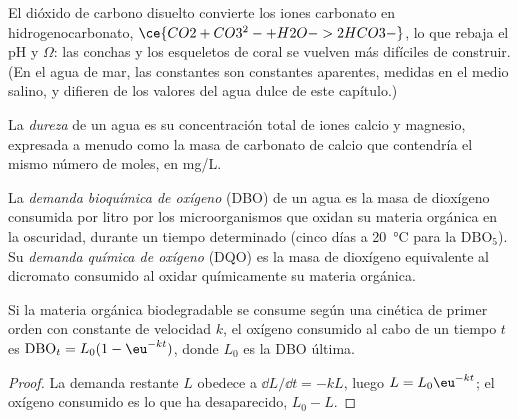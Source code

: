 El dióxido de carbono disuelto convierte los iones carbonato en hidrogenocarbonato, $\ce{CO2 + CO3^2- + H2O -> 2HCO3-}$,
lo que rebaja el pH y $\Omega$: las conchas y los esqueletos de coral se vuelven más difíciles de construir. (En
el agua de mar, las constantes son constantes aparentes, medidas en el medio salino, y
difieren de los valores del agua dulce de este capítulo.)

\begin{definition}\label{def:b3:environmental-toxicology:hardness}
La \emph{dureza} de un agua es su concentración total
de iones calcio y magnesio, expresada a menudo como la masa de carbonato de calcio
que contendría el mismo número de moles, en mg/L.
\end{definition}

\begin{definition}\label{def:b3:environmental-toxicology:oxygen-demand}
La \emph{demanda bioquímica de oxígeno} (DBO) de un
agua es la masa de dioxígeno consumida por litro por los microorganismos que oxidan su
materia orgánica en la oscuridad, durante un tiempo determinado (cinco días a \qty{20}{\celsius} para la $\mathrm{DBO_5}$). Su
\emph{demanda química de oxígeno} (DQO) es la masa de
dioxígeno equivalente al dicromato consumido al oxidar químicamente su materia
orgánica.
\end{definition}

\begin{proposition}\label{prop:b3:environmental-toxicology:bod}
Si la materia orgánica biodegradable se consume según una cinética de primer orden con constante de
velocidad $k$, el oxígeno consumido al cabo de un tiempo $t$ es $\mathrm{DBO}_t = L_0(1 - \eu^{-kt})$, donde $L_0$ es la DBO última.
\end{proposition}

\begin{proof}
La demanda restante $L$ obedece a $\dd L/\dd t = -kL$, luego $L = L_0\eu^{-kt}$; el oxígeno consumido es lo que ha desaparecido,
$L_0 - L$.
\end{proof}

